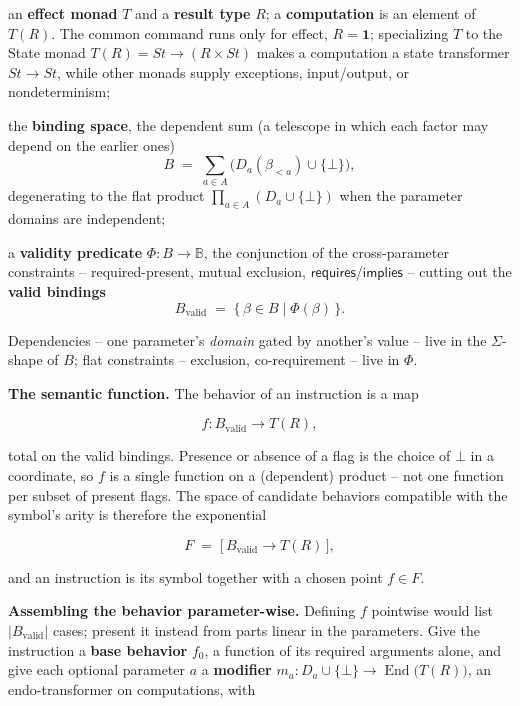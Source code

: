 \documentclass[11pt]{article}
\begin{document}
\begin{definitionlist}
    \item an \textbf{effect monad} \(T\) and a \textbf{result type} \(R\); a
          \textbf{computation} is an element of \(T(R)\). The common command runs
          only for effect, \(R=\mathbf{1}\); specializing \(T\) to the State monad
          \(T(R)=\mathit{St}\to(R\times\mathit{St})\) makes a computation a state
          transformer \(\mathit{St}\to\mathit{St}\), while other monads supply
          exceptions, input/output, or nondeterminism;
    \item the \textbf{binding space}, the dependent sum (a telescope in which each
          factor may depend on the earlier ones)
          \[
            B \;=\; \sum_{a\in A}\bigl(D_a(\beta_{<a})\cup\{\bot\}\bigr),
          \]
          degenerating to the flat product \(\prod_{a\in A}(D_a\cup\{\bot\})\) when
          the parameter domains are independent;
    \item a \textbf{validity predicate} \(\Phi\colon B\to\mathbb{B}\), the
          conjunction of the cross-parameter constraints -- required-present,
          mutual exclusion, \(\textsf{requires}\)/\(\textsf{implies}\) -- cutting
          out the \textbf{valid bindings}
          \[
            B_{\mathrm{valid}} \;=\; \{\,\beta\in B \mid \Phi(\beta)\,\}.
          \]
\end{definitionlist}

Dependencies -- one parameter's \emph{domain} gated by another's value -- live in
the \(\Sigma\)-shape of \(B\); flat constraints -- exclusion, co-requirement --
live in \(\Phi\).

\textbf{The semantic function.} The behavior of an instruction is a map

\[
  f\colon B_{\mathrm{valid}} \longrightarrow T(R),
\]

total on the valid bindings. Presence or absence of a flag is the choice of
\(\bot\) in a coordinate, so \(f\) is a single function on a (dependent) product
-- not one function per subset of present flags. The space of candidate behaviors
compatible with the symbol's arity is therefore the exponential

\[
  F \;=\; \bigl[\,B_{\mathrm{valid}}\to T(R)\,\bigr],
\]

and an instruction is its symbol together with a chosen point \(f\in F\).

\textbf{Assembling the behavior parameter-wise.} Defining \(f\) pointwise would
list \(\lvert B_{\mathrm{valid}}\rvert\) cases; present it instead from parts
linear in the parameters. Give the instruction a \textbf{base behavior} \(f_0\), a
function of its required arguments alone, and give each optional parameter \(a\) a
\textbf{modifier} \(m_a\colon D_a\cup\{\bot\}\to\operatorname{End}\bigl(T(R)\bigr)\),
an endo-transformer on computations, with
\end{document}
